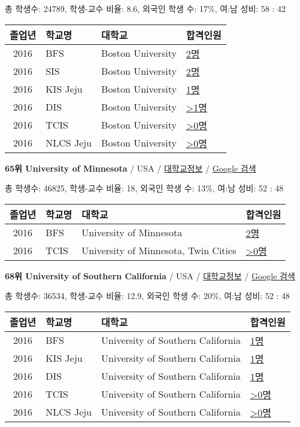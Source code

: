 \documentclass[13pt,]{article}
\begin{document}
총 학생수: 24789, 학생-교수 비율: 8.6, 외국인 학생 수: 17\%, 여:남 성비:
58 : 42

\begin{longtable}[]{@{}clll@{}}
\toprule
졸업년 & 학교명 & 대학교 & 합격인원\tabularnewline
\midrule
\endhead
2016 & BFS & Boston University &
\href{http://cafe.naver.com/assarabia/11597}{2명}\tabularnewline
2016 & SIS & Boston University &
\href{http://cafe.naver.com/assarabia/11589}{2명}\tabularnewline
2016 & KIS Jeju & Boston University &
\href{http://cafe.naver.com/assarabia/11596}{1명}\tabularnewline
2016 & DIS & Boston University &
\href{http://cafe.naver.com/assarabia/11591}{\textgreater{}1명}\tabularnewline
2016 & TCIS & Boston University &
\href{http://cafe.naver.com/assarabia/11598}{\textgreater{}0명}\tabularnewline
2016 & NLCS Jeju & Boston University &
\href{http://cafe.naver.com/assarabia/11592}{\textgreater{}0명}\tabularnewline
\bottomrule
\end{longtable}

\textbf{65위 University of Minnesota} / USA /
\href{https://www.timeshighereducation.com/world-university-rankings/university-of-minnesota?ranking-dataset=133819}{대학교정보}
/ \href{http://www.google.com/search?q=University+of+Minnesota}{Google
검색}

총 학생수: 46825, 학생-교수 비율: 18, 외국인 학생 수: 13\%, 여:남 성비:
52 : 48

\begin{longtable}[]{@{}clll@{}}
\toprule
졸업년 & 학교명 & 대학교 & 합격인원\tabularnewline
\midrule
\endhead
2016 & BFS & University of Minnesota &
\href{http://cafe.naver.com/assarabia/11597}{2명}\tabularnewline
2016 & TCIS & University of Minnesota, Twin Cities &
\href{http://cafe.naver.com/assarabia/11598}{\textgreater{}0명}\tabularnewline
\bottomrule
\end{longtable}

\textbf{68위 University of Southern California} / USA /
\href{https://www.timeshighereducation.com/world-university-rankings/university-of-southern-california?ranking-dataset=133819}{대학교정보}
/
\href{http://www.google.com/search?q=University+of+Southern+California}{Google
검색}

총 학생수: 36534, 학생-교수 비율: 12.9, 외국인 학생 수: 20\%, 여:남
성비: 52 : 48

\begin{longtable}[]{@{}clll@{}}
\toprule
졸업년 & 학교명 & 대학교 & 합격인원\tabularnewline
\midrule
\endhead
2016 & BFS & University of Southern California &
\href{http://cafe.naver.com/assarabia/11597}{1명}\tabularnewline
2016 & KIS Jeju & University of Southern California &
\href{http://cafe.naver.com/assarabia/11596}{1명}\tabularnewline
2016 & DIS & University of Southern California &
\href{http://cafe.naver.com/assarabia/11591}{1명}\tabularnewline
2016 & TCIS & University of Southern California &
\href{http://cafe.naver.com/assarabia/11598}{\textgreater{}0명}\tabularnewline
2016 & NLCS Jeju & University of Southern California &
\href{http://cafe.naver.com/assarabia/11592}{\textgreater{}0명}\tabularnewline
\bottomrule
\end{longtable}
\end{document}

